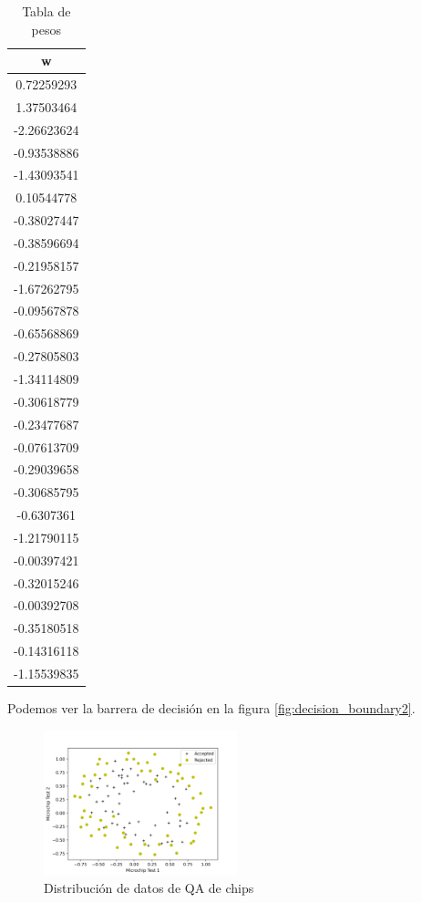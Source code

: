 \documentclass[6pt]{../../shared/AiTex}
\begin{document}
\begin{table}[H]
    \centering
    \begin{tabular}{|c|}
        \hline
        \textbf{w}  \\
        \hline
        0.72259293  \\ \hline
        1.37503464  \\ \hline
        -2.26623624 \\ \hline
        -0.93538886 \\ \hline
        -1.43093541 \\ \hline
        0.10544778  \\ \hline
        -0.38027447 \\ \hline
        -0.38596694 \\ \hline
        -0.21958157 \\ \hline
        -1.67262795 \\ \hline
        -0.09567878 \\ \hline
        -0.65568869 \\ \hline
        -0.27805803 \\ \hline
        -1.34114809 \\ \hline
        -0.30618779 \\ \hline
        -0.23477687 \\ \hline
        -0.07613709 \\ \hline
        -0.29039658 \\ \hline
        -0.30685795 \\ \hline
        -0.6307361  \\ \hline
        -1.21790115 \\ \hline
        -0.00397421 \\ \hline
        -0.32015246 \\ \hline
        -0.00392708 \\ \hline
        -0.35180518 \\ \hline
        -0.14316118 \\ \hline
        -1.15539835 \\ \hline
    \end{tabular}
    \caption{Tabla de pesos}
    \label{tab:w}
\end{table}

Podemos ver la barrera de decisión en la figura \ref{fig:decision_boundary2}.

\begin{figure}[H]
    \centering
    \includegraphics[width=0.5\textwidth]{./imagenes/muestreo2.png}
    \caption{Distribución de datos de QA de chips}
    \label{fig:dataset2}
\end{figure}
\end{document}
